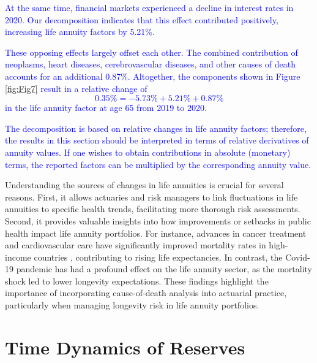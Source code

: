 \documentclass[12pt]{article}
\begin{document}
\textcolor{blue}{At the same time, financial markets experienced a decline in interest rates in 2020. Our decomposition indicates that this effect contributed positively, increasing life annuity factors by 5.21\%.}
	
\textcolor{blue}{These opposing effects largely offset each other. The combined contribution of neoplasms, heart diseases, cerebrovascular diseases, and other causes of death accounts for an additional 0.87\%. Altogether, the components shown in Figure \ref{fig:Fig7} result in a relative change of $$0.35\% = -5.73\% +  5.21\%  + 0.87\%$$ in the life annuity factor at age 65 from 2019 to 2020.}
	
\textcolor{blue}{The decomposition is based on relative changes in life annuity factors; therefore, the results in this section should be interpreted in terms of relative derivatives of annuity values. If one wishes to obtain contributions in absolute (monetary) terms, the reported factors can be multiplied by the corresponding annuity value.}
	


Understanding the sources of changes in life annuities is crucial for several reasons. First, it allows actuaries and risk managers to link fluctuations in life annuities to specific health trends, facilitating more thorough risk assessments. Second, it provides valuable insights into how improvements or setbacks in public health impact life annuity portfolios. For instance, advances in cancer treatment and cardiovascular care have significantly improved mortality rates in high-income countries \citep{weber2023gains}, contributing to rising life expectancies. In contrast, the Covid-19 pandemic has had a profound effect on the life annuity sector, as the mortality shock led to lower longevity expectations. These findings highlight the importance of incorporating cause-of-death analysis into actuarial practice, particularly when managing longevity risk in life annuity portfolios.


\FloatBarrier
\section{Time Dynamics of Reserves}\label{sec:Reserves}
\end{document}
